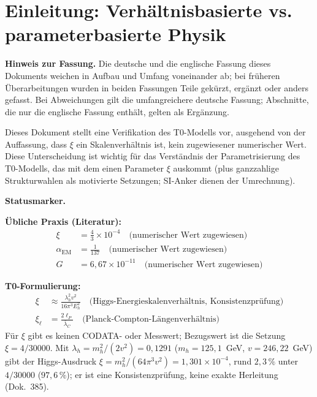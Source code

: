 \section{Einleitung: Verhältnisbasierte vs. parameterbasierte Physik}

	\medskip\noindent\textbf{Hinweis zur Fassung.} Die deutsche und die englische Fassung dieses Dokuments weichen in Aufbau und Umfang voneinander ab; bei früheren Überarbeitungen wurden in beiden Fassungen Teile gekürzt, ergänzt oder anders gefasst. Bei Abweichungen gilt die umfangreichere deutsche Fassung; Abschnitte, die nur die englische Fassung enthält, gelten als Ergänzung.

	
	Dieses Dokument stellt eine Verifikation des T0-Modells vor, ausgehend von der Auffassung, dass $\xi$ ein Skalenverhältnis ist, kein zugewiesener numerischer Wert. Diese Unterscheidung ist wichtig für das Verständnis der Parametrisierung des T0-Modells, das mit dem einen Parameter $\xi$ auskommt (plus ganzzahlige Strukturwahlen als motivierte Setzungen; SI-Anker dienen der Umrechnung).
	
	\medskip\noindent\textbf{Statusmarker.}
	
	
	\begin{tcolorbox}[colback=red!5!white,colframe=red!75!black,title=Zwei Formulierungen]
		\textbf{Übliche Praxis (Literatur):}
		\begin{align}
			\xi &= \tfrac{4}{3} \times 10^{-4} \quad \text{(numerischer Wert zugewiesen)} \\
			\alpha_{\text{EM}} &= \frac{1}{137} \quad \text{(numerischer Wert zugewiesen)} \\
			G &= 6,67 \times 10^{-11} \quad \text{(numerischer Wert zugewiesen)}
		\end{align}
		
		\textbf{T0-Formulierung:}
		\begin{align}
			\xi &\approx \frac{\lambda_h^2 v^2}{16\pi^3 E_h^2} \quad \text{(Higgs-Energieskalenverhältnis, Konsistenzprüfung)} \\
			\xi_\ell &= \frac{2\ell_P}{\bar{\lambda}_C} \quad \text{(Planck-Compton-Längenverhältnis)}
		\end{align}
		Für $\xi$ gibt es keinen CODATA- oder Messwert; Bezugswert ist die Setzung $\xi = 4/30000$. Mit $\lambda_h = m_h^2/(2v^2) = 0,1291$ ($m_h = 125,1$~GeV, $v = 246,22$~GeV) gibt der Higgs-Ausdruck $\xi = m_h^2/(64\pi^3 v^2) = 1,301\times10^{-4}$, rund $2,3\,\%$ unter $4/30000$ ($97,6\,\%$); er ist eine Konsistenzprüfung, keine exakte Herleitung (Dok.~385).
	\end{tcolorbox}
	
